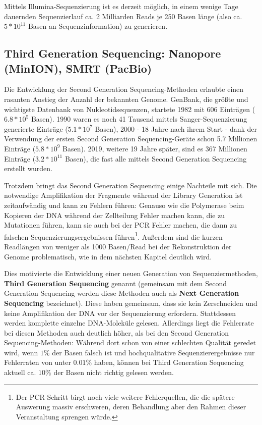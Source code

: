 Mittels Illumina-Sequenzierung ist es derzeit möglich, in einem wenige Tage dauernden Sequenzierlauf ca. 2 Milliarden Reads je 250 Basen länge (also ca. $5*10^{11}$ Basen an Sequenzinformation) zu generieren.

\subsection{Third Generation Sequencing: Nanopore (MinION), SMRT (PacBio)}

Die Entwicklung der Second Generation Sequencing-Methoden erlaubte einen rasanten Anstieg der Anzahl der bekannten Genome. GenBank, die größte und wichtigste Datenbank von Nukleotidsequenzen, startete 1982 mit 606 Einträgen ($6.8 * 10^5$ Basen). 1990 waren es noch 41 Tausend mittels Sanger-Sequenzierung generierte Einträge ($5.1*10^7$ Basen), 2000 - 18 Jahre nach ihrem Start - dank der Verwendung der ersten Second Generation Sequencing-Geräte schon 5.7 Millionen Einträge ($5.8 * 10^9$ Basen). 2019, weitere 19 Jahre später, sind es 367 Millionen Einträge ($3.2 * 10^{11}$ Basen), die fast alle mittels Second Generation Sequencing erstellt wurden. 

Trotzdem bringt das Second Generation Sequencing einige Nachteile mit sich. Die notwendige Amplifikation der Fragmente während der Library Generation ist zeitaufwändig und kann zu Fehlern führen: Genauso wie die Polymerase beim Kopieren der DNA während der Zellteilung Fehler machen kann, die zu Mutationen führen, kann sie auch bei der PCR Fehler machen, die dann zu falschen Sequenzierungsergebnissen führen\footnote{Der PCR-Schritt birgt noch viele weitere Fehlerquellen, die die spätere Auswerung massiv erschweren, deren Behandlung aber den Rahmen dieser Veranstaltung sprengen würde.}. Außerdem sind die kurzen Readlängen von weniger als 1000 Basen/Read bei der Rekonstruktion der Genome problematisch, wie in dem nächsten Kapitel deutlich wird.

Dies motivierte die Entwicklung einer neuen Generation von Sequenziermethoden, \textbf{Third Generation Sequencing} genannt (gemeinsam mit dem Second Generation Sequencing werden diese Methoden auch als \textbf{Next Generation Sequencing} bezeichnet). Diese haben gemeinsam, dass sie kein Zerschneiden und keine Amplifikation der DNA vor der Sequenzierung erfordern. Stattdessen werden komplette einzelne DNA-Moleküle gelesen. Allerdings liegt die Fehlerrate bei diesen Methoden auch deutlich höher, als bei den Second Generation Sequencing-Methoden: Während dort schon von einer schlechten Qualität geredet wird, wenn $1\%$ der Basen falsch ist und hochqualitative Sequenzierergebnisse nur Fehlerraten von unter $0.01\%$ haben, können bei Third Generation Sequencing aktuell ca. $10\%$ der Basen nicht richtig gelesen werden.

